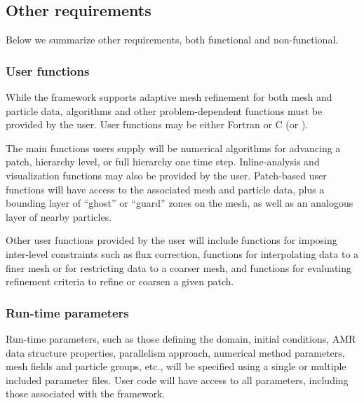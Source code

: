 \documentclass[10pt,twocolumn]{article}
\begin{document}
\subsection{Other requirements} \label{ss:require-other}

Below we summarize other requirements, both functional and
non-functional.
  
\subsubsection{User functions} \label{sss:require-user}

While the framework supports adaptive mesh refinement for both mesh
and particle data, algorithms and other problem-dependent functions
must be provided by the user.  User functions may be either Fortran or
C (or \cpp).  

The main functions users supply will be numerical algorithms for
advancing a patch, hierarchy level, or full hierarchy one time step.
Inline-analysis and visualization functions may also be provided by
the user.  Patch-based user functions will have access to the
associated mesh and particle data, plus a bounding layer of ``ghost''
or ``guard'' zones on the mesh, as well as an analogous layer of
nearby particles.

Other user functions provided by the user will include functions for
imposing inter-level constraints such as flux correction, functions
for interpolating data to a finer mesh or for restricting data to a
coarser mesh, and functions for evaluating refinement criteria to
refine or coarsen a given patch.



\subsubsection{Run-time parameters} \label{sss:require-parameters}

Run-time parameters, such as those defining the domain, initial
conditions, AMR data structure properties, parallelism approach,
numerical method parameters, mesh fields and particle groups, etc.,
will be specified using a single or multiple included parameter files.
User code will have access to all parameters, including those
associated with the framework.
\end{document}
